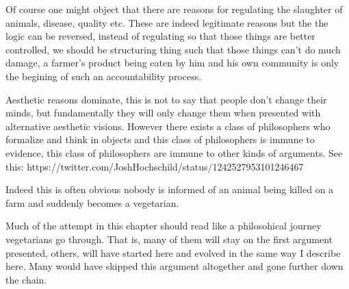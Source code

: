 Of course one might object that there are reasons for regulating the slaughter of animals, disease, quality etc. These are indeed legitimate reasons but the the logic can be reversed, instead of regulating so that those things are better controlled, we should be structuring thing such that those things can't do much damage, a farmer's product being eaten by him and his own community is only the begining of such an accountability process. 

Aesthetic reasons dominate, this is not to say that people don't change their minds, but fundamentally they will only change them when presented with alternative aesthetic visions. However there exists a class of philosophers who formalize and think in objects and this class of philosophers is immune to evidence, this class of philosophers are immune to other kinds of arguments.
See this: https://twitter.com/JoshHochschild/status/1242527953101246467

Indeed this is often obvious nobody is informed of an animal being killed on a farm and suddenly becomes a vegetarian.

Much of the attempt in this chapter should read like a philosohical journey vegetarians go through. That is, many of them will stay on the first argument presented, others, will have started here and evolved in the same way I describe here. Many would have skipped this argument altogether and gone further down the chain. 